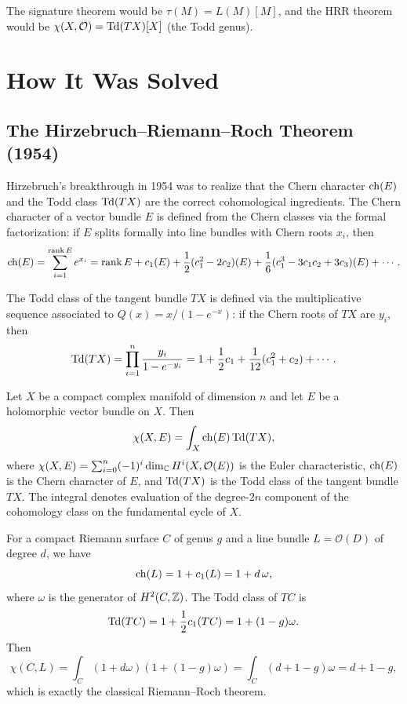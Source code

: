 The signature theorem would be \(\tau(M) = L(M)[M]\), and the HRR
theorem would be \(\chi(X, \mathcal{O}) = \operatorname{Td}(TX)[X]\) (the Todd genus).

\section{How It Was Solved}

\subsection{The Hirzebruch--Riemann--Roch Theorem (1954)}

Hirzebruch's breakthrough in 1954 was to realize that the Chern
character \(\operatorname{ch}(E)\) and the Todd class \(\operatorname{Td}(TX)\) are the correct
cohomological ingredients. The Chern character of a vector bundle
\(E\) is defined from the Chern classes via the formal factorization:
if \(E\) splits formally into line bundles with Chern roots \(x_i\),
then
\[
\operatorname{ch}(E) = \sum_{i=1}^{\rank E} e^{x_i}
= \rank E + c_1(E) + \frac12(c_1^2 - 2c_2)(E)
+ \frac16(c_1^3 - 3c_1c_2 + 3c_3)(E) + \cdots.
\]

The Todd class of the tangent bundle \(TX\) is defined via the
multiplicative sequence associated to \(Q(x) = x/(1 - e^{-x})\): if the
Chern roots of \(TX\) are \(y_i\), then
\[
\operatorname{Td}(TX) = \prod_{i=1}^n \frac{y_i}{1 - e^{-y_i}}
= 1 + \frac12 c_1 + \frac1{12}(c_1^2 + c_2) + \cdots.
\]

\begin{theorem}
Let \(X\) be a compact complex manifold of dimension \(n\) and let
\(E\) be a holomorphic vector bundle on \(X\). Then
\[
\chi(X, E) = \int_X \operatorname{ch}(E) \operatorname{Td}(TX),
\]
where \(\chi(X, E) = \sum_{i=0}^n (-1)^i \dim_{\mathbb{C}} H^i(X,
\mathcal{O}(E))\) is the Euler characteristic, \(\operatorname{ch}(E)\) is the Chern
character of \(E\), and \(\operatorname{Td}(TX)\) is the Todd class of the tangent
bundle \(TX\). The integral denotes evaluation of the degree-\(2n\)
component of the cohomology class on the fundamental cycle of \(X\).
\end{theorem}

\begin{example}
For a compact Riemann surface \(C\) of genus \(g\) and a line bundle
\(L = \mathcal{O}(D)\) of degree \(d\), we have
\[
\operatorname{ch}(L) = 1 + c_1(L) = 1 + d\,\omega,
\]
where \(\omega\) is the generator of \(H^2(C, \mathbb{Z})\). The Todd class of
\(TC\) is
\[
\operatorname{Td}(TC) = 1 + \frac12 c_1(TC) = 1 + (1 - g)\omega.
\]
Then
\[
\chi(C, L) = \int_C (1 + d\omega)(1 + (1-g)\omega)
= \int_C (d + 1 - g)\omega = d + 1 - g,
\]
which is exactly the classical Riemann--Roch theorem.
\end{example}

